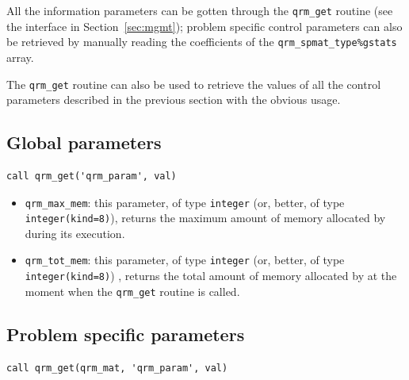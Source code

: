 \documentclass[11pt]{article}
\begin{document}
All the information parameters can be gotten through the \texttt{qrm\_get}
routine (see the interface in Section~\ref{sec:mgmt}); problem
specific control parameters can also be retrieved by manually reading the
coefficients of the \texttt{qrm\_spmat\_type\%gstats} array. 

The \texttt{qrm\_get} routine can also be used to retrieve the values
of all the control parameters described in the previous section with
the obvious usage.

\subsection{Global parameters}
\label{sec:gparms}

\begin{lstlisting}
call qrm_get('qrm_param', val)
\end{lstlisting}

\begin{itemize}
\item \texttt{qrm\_max\_mem}: this parameter, of type \texttt{integer}
  (or, better, of type \texttt{integer(kind=8)}), returns the maximum
  amount of memory allocated by \qrm during its execution.
\item \texttt{qrm\_tot\_mem}: this parameter, of type \texttt{integer}
  (or, better, of type \texttt{integer(kind=8)}) , returns the total
  amount of memory allocated by \qrm at the moment when the
  \texttt{qrm\_get} routine is called.
\end{itemize}

\subsection{Problem specific parameters}
\label{sec:lget}

\begin{lstlisting}
call qrm_get(qrm_mat, 'qrm_param', val)
\end{lstlisting}
\end{document}

